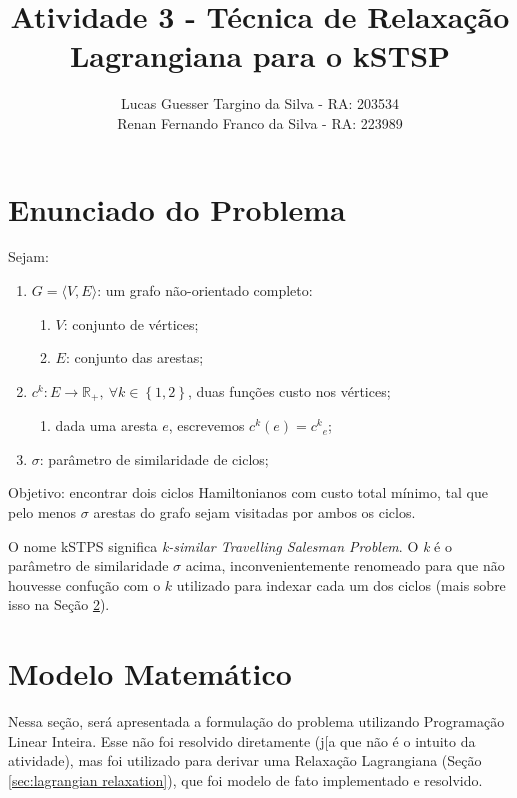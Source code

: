 \documentclass{article}
\title{Atividade 3 - Técnica de Relaxação Lagrangiana para o kSTSP}
\author{
	Lucas Guesser Targino da Silva - RA: 203534 \\
    Renan Fernando Franco da Silva - RA: 223989
}
\newcommand{\secref}[1]{(Seção \ref{#1})}
\newcommand{\Set}[1]{\ensuremath{\left\{#1\right\}}}
\newcommand{\edge}{\ensuremath{e}}
\newcommand{\edges}{\ensuremath{E}}
\newcommand{\vertices}{\ensuremath{V}}
\newcommand{\ncycles}{2}
\newcommand{\allCycles}{\ensuremath{\Set{1, \ncycles}}}
\newcommand{\cycle}{\ensuremath{k}}
\newcommand{\graph}{\ensuremath{G}}
\newcommand{\cost}[1]{\ensuremath{c^{#1}}}
\newcommand{\costk}{\ensuremath{\cost{\cycle}}}
\newcommand{\costke}{\ensuremath{\cost{\cycle}_{\edge}}}
\newcommand{\positiveReal}{\ensuremath{\mathbb{R}_+}}
\newcommand{\similarity}{\ensuremath{\sigma}}
\begin{document}
\maketitle

\section{Enunciado do Problema}

Sejam:

\begin{enumerate}
    \item $\graph = \langle \vertices,\edges \rangle$: um grafo não-orientado completo:
    \begin{enumerate}
        \item $\vertices$: conjunto de vértices;
        \item $\edges$: conjunto das arestas;
    \end{enumerate}
    \item $\costk: \edges \rightarrow \positiveReal,\ \forall \cycle \in \allCycles$, duas funções custo nos vértices;
        \begin{enumerate}
            \item dada uma aresta $\edge$, escrevemos $\costk(\edge) = \costke$;
        \end{enumerate}
    \item $\similarity$: parâmetro de similaridade de ciclos;
\end{enumerate}

Objetivo: encontrar dois ciclos Hamiltonianos com custo total mínimo, tal que pelo menos $\similarity$ arestas do grafo sejam visitadas por ambos os ciclos.

O nome kSTPS significa \textit{k-similar Travelling Salesman Problem}. O \textit{k} é o parâmetro de similaridade $\similarity$ acima, inconvenientemente renomeado para que não houvesse confução com o $\cycle$ utilizado para indexar cada um dos ciclos (mais sobre isso na Seção \ref{sec:mathematical model}).

\section{Modelo Matemático}
\label{sec:mathematical model}

Nessa seção, será apresentada a formulação do problema utilizando Programação Linear Inteira. Esse não foi resolvido diretamente (j[a que não é o intuito da atividade), mas foi utilizado para derivar uma Relaxação Lagrangiana \secref{sec:lagrangian relaxation}, que foi modelo de fato implementado e resolvido.
\end{document}
